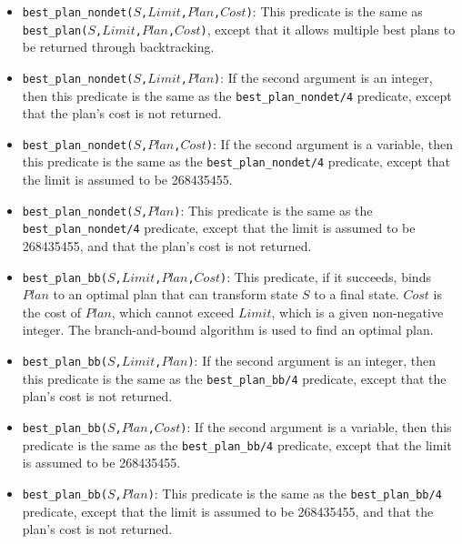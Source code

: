\begin{itemize}
\item \texttt{best\_plan\_nondet($S$,$Limit$,$Plan$,$Cost$)}: This predicate is the same as \\\texttt{best\_plan($S$,$Limit$,$Plan$,$Cost$)}, except that it allows multiple best plans to be returned through backtracking.

\item \texttt{best\_plan\_nondet($S$,$Limit$,$Plan$)}: If the second argument is an integer, then this predicate is the same as the \texttt{best\_plan\_nondet/4} predicate, except that the plan's cost is not returned. 

\item \texttt{best\_plan\_nondet($S$,$Plan$,$Cost$)}: If the second argument is a variable, then this predicate is the same as the \texttt{best\_plan\_nondet/4} predicate, except that the limit is assumed to be 268435455.

\item \texttt{best\_plan\_nondet($S$,$Plan$)}: This predicate is the same as the \texttt{best\_plan\_nondet/4} predicate, except that the limit is assumed to be 268435455, and that the plan's cost is not returned.

\item \texttt{best\_plan\_bb($S$,$Limit$,$Plan$,$Cost$)}: 
This predicate, if it succeeds, binds $Plan$ to an optimal plan that can transform state $S$ to a final state. $Cost$ is the cost of $Plan$, which cannot exceed $Limit$, which is a given non-negative integer. The branch-and-bound algorithm is used to find an optimal plan.

\item \texttt{best\_plan\_bb($S$,$Limit$,$Plan$)}: If the second argument is an integer, then this predicate is the same as the \texttt{best\_plan\_bb/4} predicate, except that the plan's cost is not returned. 

\item \texttt{best\_plan\_bb($S$,$Plan$,$Cost$)}: If the second argument is a variable, then this predicate is the same as the \texttt{best\_plan\_bb/4} predicate, except that the limit is assumed to be 268435455.

\item \texttt{best\_plan\_bb($S$,$Plan$)}: 
This predicate is the same as the \texttt{best\_plan\_bb/4} predicate, except that the limit is assumed to be 268435455, and that the plan's cost is not returned.


\end{itemize}
